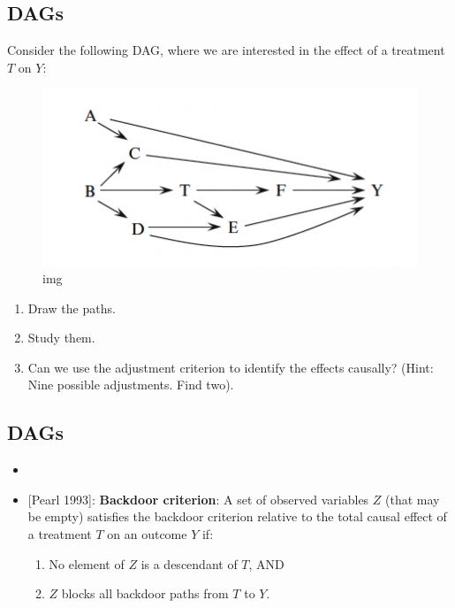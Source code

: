 \documentclass[11pt]{article}
\providecommand{\tightlist}{%
      \setlength{\itemsep}{0pt}\setlength{\parskip}{0pt}}
\begin{document}
    \hypertarget{dags}{%
\subsection{DAGs}\label{dags}}

Consider the following DAG, where we are interested in the effect of a
treatment \(T\) on \(Y\):

\begin{figure}
\centering
\includegraphics{../img/dag6.png}
\caption{img}
\end{figure}

\begin{enumerate}
\def\labelenumi{\arabic{enumi}.}
\tightlist
\item
  Draw the paths.
\item
  Study them.
\item
  Can we use the adjustment criterion to identify the effects causally?
  (Hint: Nine possible adjustments. Find two).
\end{enumerate}

    \hypertarget{dags}{%
\subsection{DAGs}\label{dags}}

\begin{itemize}
\tightlist
\item
\item
  {[}Pearl 1993{]}: \textbf{Backdoor criterion}: A set of observed
  variables \(Z\) (that may be empty) satisfies the backdoor criterion
  relative to the total causal effect of a treatment \(T\) on an outcome
  \(Y\) if:

  \begin{enumerate}
  \def\labelenumi{\arabic{enumi}.}
  \tightlist
  \item
    No element of \(Z\) is a descendant of \(T\), AND
  \item
    \(Z\) blocks all backdoor paths from \(T\) to \(Y\).
  \end{enumerate}
\end{itemize}
\end{document}
